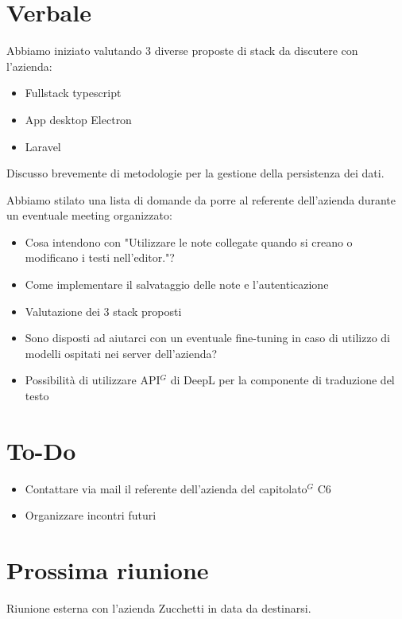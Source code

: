 \documentclass[a4paper,10pt]{article}
\begin{document}
\section*{Verbale}
Abbiamo iniziato valutando 3 diverse proposte di stack da discutere con l'azienda:\begin{itemize}
    \item Fullstack typescript
    \item App desktop Electron
    \item Laravel
\end{itemize}
Discusso brevemente di metodologie per la gestione della persistenza dei dati.

\vspace{1\baselineskip}

Abbiamo stilato una lista di domande da porre al referente dell'azienda durante un eventuale meeting organizzato:\begin{itemize}
    \item Cosa intendono con "Utilizzare le note collegate quando si creano o modificano i testi nell’editor."?
    \item Come implementare il salvataggio delle note e l'autenticazione
    \item Valutazione dei 3 stack proposti
    \item Sono disposti ad aiutarci con un eventuale fine-tuning in caso di utilizzo di modelli ospitati nei server dell'azienda?
    \item Possibilità di utilizzare API$^G$ di DeepL per la componente di traduzione del testo
    
\end{itemize}
\newpage

\section*{To-Do}
\begin{itemize}
    \item Contattare via mail il referente dell'azienda del capitolato$^G$ C6
    \item Organizzare incontri futuri
\end{itemize}

\section*{Prossima riunione}
Riunione esterna con l'azienda Zucchetti in data da destinarsi.
\end{document}

